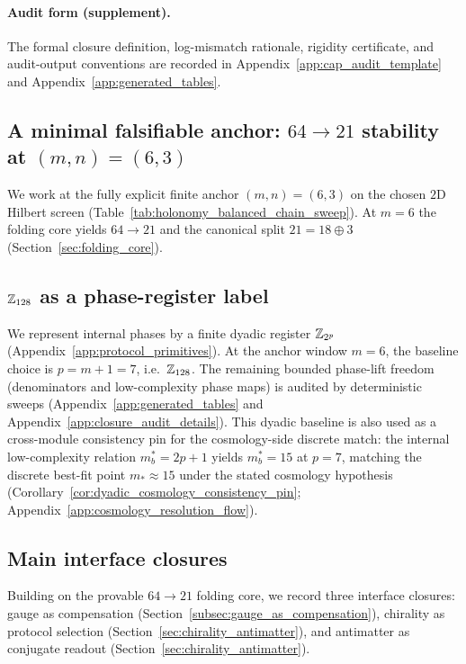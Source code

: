 \paragraph{Audit form (supplement).}
\AuditTag The formal closure definition, log-mismatch rationale, rigidity certificate, and audit-output conventions are recorded in Appendix~\ref{app:cap_audit_template} and Appendix~\ref{app:generated_tables}.

\subsection{A minimal falsifiable anchor: \texorpdfstring{$64\to 21$}{64->21} stability at \texorpdfstring{$(m,n)=(6,3)$}{(m,n)=(6,3)}}
\label{subsec:minimal_anchor}

\MathTag We work at the fully explicit finite anchor $(m,n)=(6,3)$ on the chosen $2$D Hilbert screen (Table~\ref{tab:holonomy_balanced_chain_sweep}).
At $m=6$ the folding core yields $64\to 21$ and the canonical split $21=18\oplus 3$ (Section~\ref{sec:folding_core}).

\subsection{\texorpdfstring{$\mathbb{Z}_{128}$}{Z128} as a phase-register label}
\label{subsec:z128_label}

\InterfaceTag We represent internal phases by a finite dyadic register $\mathbb{Z}_{2^p}$ (Appendix~\ref{app:protocol_primitives}).
At the anchor window $m=6$, the baseline choice is $p=m+1=7$, i.e.\ $\mathbb{Z}_{128}$.
The remaining bounded phase-lift freedom (denominators and low-complexity phase maps) is audited by deterministic sweeps (Appendix~\ref{app:generated_tables} and Appendix~\ref{app:closure_audit_details}).
\AuditTag This dyadic baseline is also used as a cross-module consistency pin for the cosmology-side discrete match: the internal low-complexity relation $m_b^\ast=2p+1$ yields $m_b^\ast=15$ at $p=7$, matching the discrete best-fit point $m_\ast\approx 15$ under the stated cosmology hypothesis (Corollary~\ref{cor:dyadic_cosmology_consistency_pin}; Appendix~\ref{app:cosmology_resolution_flow}).

\subsection{Main interface closures}
\label{subsec:intro_contrib}

Building on the provable $64\to 21$ folding core, we record three interface closures:
\InterfaceTag gauge as compensation (Section~\ref{subsec:gauge_as_compensation}),
\InterfaceTag chirality as protocol selection (Section~\ref{sec:chirality_antimatter}),
and \InterfaceTag antimatter as conjugate readout (Section~\ref{sec:chirality_antimatter}).

